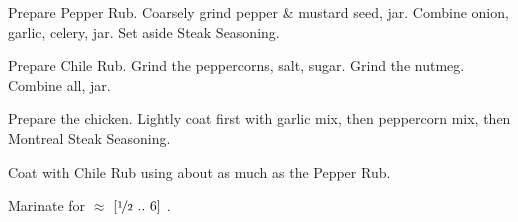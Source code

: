 \begin{preparation}
\item Prepare Pepper Rub.
	Coarsely grind pepper \& mustard seed, jar.
	Combine onion, garlic, celery, jar.
	Set aside Steak Seasoning.
\item Prepare Chile Rub.
	Grind the peppercorns, salt, sugar.
	Grind the nutmeg.
	Combine all, jar.
\item Prepare the chicken.
	Lightly coat first with garlic mix, then peppercorn mix, then Montreal Steak Seasoning.
\item Coat with Chile Rub using about as much as the Pepper Rub.
\item Marinate for $\approx$ $[\nicefrac{1}{2}~..~6]$ \hour.
\end{preparation}


\recipeend%
